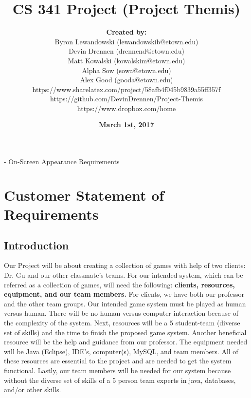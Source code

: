 \documentclass[11pt,a4paper]{article}
\begin{document}
\title{\textbf{CS 341 Project (Project Themis)}}
\author{\textbf{Created by:} \\\Large Byron Lewandowski (lewandowskib@etown.edu) \\\Large Devin Drennen (drennend@etown.edu)\\\Large Matt Kowalski (kowalskim@etown.edu)   \\\Large Alpha Sow (sowa@etown.edu)  \\\Large Alex Good (gooda@etown.edu) \\https://www.sharelatex.com/project/58afb4f045b9839a55ff357f 
\\https://github.com/DevinDrennen/Project-Themis 
\\https://www.dropbox.com/home }

\date{\textbf{March 1st, 2017}}
\maketitle

\tableofcontents\clearpage

\listoffigures\clearpage
{} - On-Screen Appearance Requirements\clearpage

\setcounter{secnumdepth}{2}
\setcounter{tocdepth}{2}





\section{Customer Statement of Requirements}

\subsection{Introduction}

Our Project will be about creating a collection of games with help of two clients: Dr. Gu and our other classmate's teams. For our intended system, which can be referred as a collection of games, will need the following: \textbf{clients, resources, equipment, and our team members.} For clients, we have both our professor and the other team groups. Our intended game system must be played as human versus human. There will be no human versus computer interaction because of the complexity of the system. Next, resources will be a 5 student-team (diverse set of skills) and the time to finish the proposed game system. Another beneficial resource will be the help and guidance from our professor. The equipment needed will be Java (Eclipse), IDE's, computer(s), MySQL, and team members. All of these resources are essential to the project and are needed to get the system functional. Lastly, our team members will be needed for our system because without the diverse set of skills of a 5 person team experts in java, databases, and/or other skills. 
\end{document}
